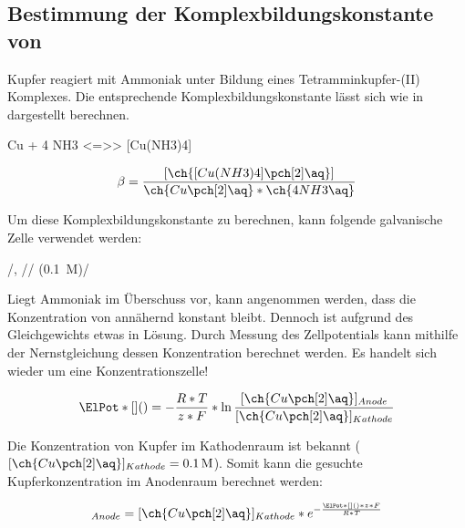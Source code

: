 \documentclass{article}
\begin{document}
      \pagebreak
        
      \subsection{Bestimmung der Komplexbildungskonstante von \ch{[Cu(NH3)4]\pch[2]}}
        
        Kupfer reagiert mit Ammoniak unter Bildung eines Tetramminkupfer-(II) Komplexes. Die entsprechende Komplexbildungskonstante lässt sich wie in dargestellt berechnen.
        
        \begin{reaction}
          Cu\pch[2]\aq{} + 4 NH3\aq{} <=>> [Cu(NH3)4]\pch[2]\aq \label{rec:Komplexbilgun}
        \end{reaction}
        
        \begin{equation}
          \beta = \frac{[\ch{[Cu(NH3)4]\pch[2]\aq}]}{\ch{Cu\pch[2]\aq} * \ch{4 NH3\aq}} \label{eq:Komplexbildungskonstanten}
        \end{equation}
        
        Um diese Komplexbildungskonstante zu berechnen, kann folgende galvanische Zelle verwendet werden:
        
        \begin{center}
          /\ch{[Cu(NH3)4]\pch[2]\aq}, //  (\SI[mode=text]{0.1}{M})/
        \end{center}
        
        Liegt Ammoniak im Überschuss vor, kann angenommen werden, dass die Konzentration von \ch{[Cu(NH3)4]\pch[2]\aq} annähernd konstant bleibt. Dennoch ist aufgrund des Gleichgewichts etwas  in Lösung. Durch Messung des Zellpotentials kann mithilfe der Nernstgleichung dessen Konzentration berechnet werden. Es handelt sich wieder um eine Konzentrationszelle!
        
        \begin{equation}
          \ElPot*[](){} = - \frac{R * T}{z * F} * \ln \frac{[\ch{Cu\pch[2]\aq}]_{Anode}}{[\ch{Cu\pch[2]\aq}]_{Kathode}}
        \end{equation}
        
        Die Konzentration von Kupfer im Kathodenraum ist bekannt ($[\ch{Cu\pch[2]\aq}]_{Kathode} = \SI[mode=text]{0.1}{M}$). Somit kann die gesuchte Kupferkonzentration im Anodenraum berechnet werden:
        
        \begin{equation}
          [\ch{Cu\pch[2]\aq}]_{Anode} = [\ch{Cu\pch[2]\aq}]_{Kathode} * e^{- \frac{\ElPot*[](){} * z * F}{R * T}}
        \end{equation}
        
\end{document}
